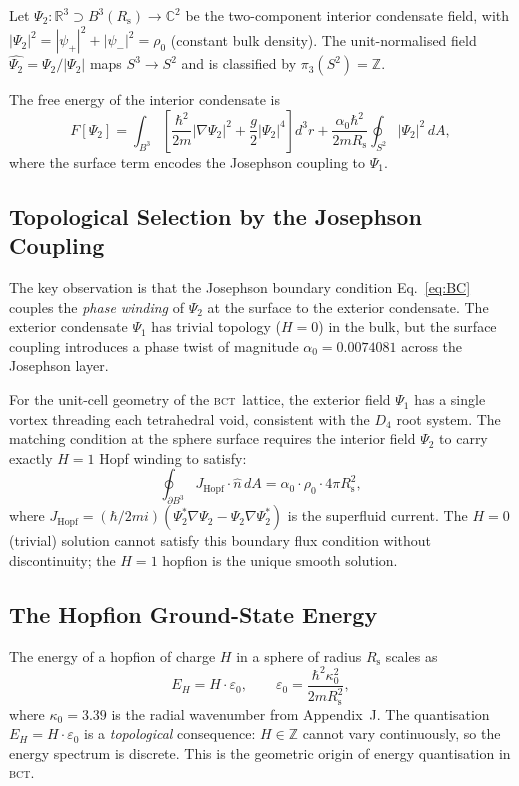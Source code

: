\documentclass[aps,prl,preprint,superscriptaddress,floatfix]{revtex4-2}
\newcommand{\az}{\alpha_0}
\newcommand{\BCT}{\textsc{bct}}
\newcommand{\Psiint}{\Psi_2}
\newcommand{\Psiext}{\Psi_1}
\newcommand{\Rsph}{R_{\mathrm{s}}}
\newcommand{\kz}{\kappa_0}
\newcommand{\HopfN}{H}
\begin{document}
Let $\Psiint:\mathbb{R}^3\supset B^3(\Rsph)\to\mathbb{C}^2$ be the
two-component interior condensate field, with
$|\Psiint|^2 = |\psi_+|^2 + |\psi_-|^2 = \rho_0$ (constant bulk density).
The unit-normalised field $\hat{\Psiint} = \Psiint/|\Psiint|$ maps
$S^3\to S^2$ and is classified by $\pi_3(S^2)=\mathbb{Z}$.

The free energy of the interior condensate is
\begin{equation}
  F[\Psiint] = \int_{B^3}
  \left[\frac{\hbar^2}{2m}|\nabla\Psiint|^2
  + \frac{g}{2}|\Psiint|^4\right] d^3r
  + \frac{\az\hbar^2}{2m\Rsph}\oint_{S^2}|\Psiint|^2\,dA,
  \label{eq:free-energy}
\end{equation}
where the surface term encodes the Josephson coupling to $\Psiext$.

\subsection{Topological Selection by the Josephson Coupling}

The key observation is that the Josephson boundary condition
Eq.~\eqref{eq:BC} couples the \emph{phase winding} of $\Psiint$ at the
surface to the exterior condensate.
The exterior condensate $\Psiext$ has trivial topology ($\HopfN=0$) in
the bulk, but the surface coupling introduces a phase twist of magnitude
$\az = 0.0074081$ across the Josephson layer.

For the unit-cell geometry of the \BCT\ lattice, the exterior field
$\Psiext$ has a single vortex threading each tetrahedral void, consistent
with the $D_4$ root system.
The matching condition at the sphere surface requires the interior field
$\Psiint$ to carry exactly $\HopfN=1$ Hopf winding to satisfy:
\begin{equation}
  \oint_{\partial B^3} J_{\mathrm{Hopf}}\cdot\hat{n}\,dA
  = \az\cdot\rho_0\cdot 4\pi\Rsph^2,
  \label{eq:hopf-matching}
\end{equation}
where $J_{\mathrm{Hopf}} = (\hbar/2mi)(\Psiint^*\nabla\Psiint
- \Psiint\nabla\Psiint^*)$ is the superfluid current.
The $\HopfN=0$ (trivial) solution cannot satisfy this boundary flux
condition without discontinuity; the $\HopfN=1$ hopfion is the unique
smooth solution.

\subsection{The Hopfion Ground-State Energy}

The energy of a hopfion of charge $\HopfN$ in a sphere of radius $\Rsph$
scales as~\cite{Hopfion1,Hopfion2}
\begin{equation}
  E_{\HopfN} = \HopfN\cdot\varepsilon_0,\qquad
  \varepsilon_0 = \frac{\hbar^2\kz^2}{2m\Rsph^2},
  \label{eq:hopfion-energy}
\end{equation}
where $\kz = 3.39$ is the radial wavenumber from Appendix~J.
The quantisation $E_{\HopfN} = \HopfN\cdot\varepsilon_0$ is a
\emph{topological} consequence: $\HopfN\in\mathbb{Z}$ cannot vary
continuously, so the energy spectrum is discrete.
This is the geometric origin of energy quantisation in \BCT.
\end{document}

